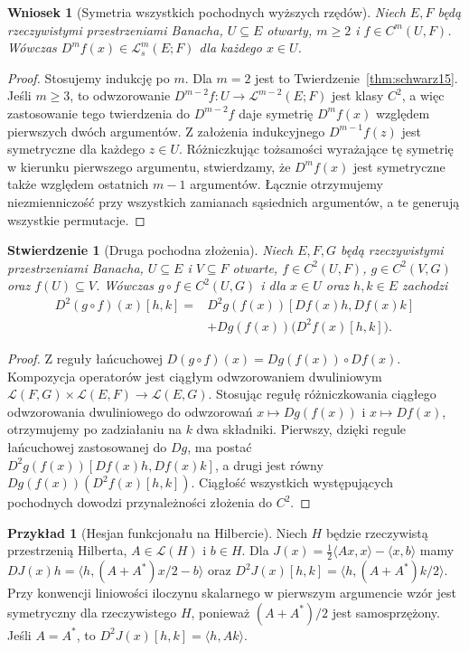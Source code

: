 \documentclass[11pt,a4paper]{article}
\numberwithin{equation}{section}
\theoremstyle{plain}
\newtheorem{stwierdzenie}[twierdzenie]{Stwierdzenie}
\newtheorem{wniosek}[twierdzenie]{Wniosek}
\theoremstyle{definition}
\newtheorem{przyklad}[twierdzenie]{Przykład}
\theoremstyle{remark}
\begin{document}
\begin{wniosek}[Symetria wszystkich pochodnych wyższych rzędów]
\label{cor:symmetric-higher15}
Niech $E,F$ będą rzeczywistymi przestrzeniami Banacha, $U\subseteq E$ otwarty, $m\ge2$ i $f\in C^m(U,F)$. Wówczas $D^mf(x)\in\mathcal L_s^m(E;F)$ dla każdego $x\in U$.
\end{wniosek}
\begin{proof}
Stosujemy indukcję po $m$. Dla $m=2$ jest to Twierdzenie~\ref{thm:schwarz15}. Jeśli $m\ge3$, to odwzorowanie $D^{m-2}f:U\to\mathcal L^{m-2}(E;F)$ jest klasy $C^2$, a więc zastosowanie tego twierdzenia do $D^{m-2}f$ daje symetrię $D^mf(x)$ względem pierwszych dwóch argumentów. Z założenia indukcyjnego $D^{m-1}f(z)$ jest symetryczne dla każdego $z\in U$. Różniczkując tożsamości wyrażające tę symetrię w kierunku pierwszego argumentu, stwierdzamy, że $D^mf(x)$ jest symetryczne także względem ostatnich $m-1$ argumentów. Łącznie otrzymujemy niezmienniczość przy wszystkich zamianach sąsiednich argumentów, a te generują wszystkie permutacje.
\end{proof}

\begin{stwierdzenie}[Druga pochodna złożenia]
\label{prop:second-chain15}
Niech $E,F,G$ będą rzeczywistymi przestrzeniami Banacha, $U\subseteq E$ i $V\subseteq F$ otwarte, $f\in C^2(U,F)$, $g\in C^2(V,G)$ oraz $f(U)\subseteq V$. Wówczas $g\circ f\in C^2(U,G)$ i dla $x\in U$ oraz $h,k\in E$ zachodzi
\[
\begin{aligned}
D^2(g\circ f)(x)[h,k]
={}&D^2g(f(x))[Df(x)h,Df(x)k]\\
 &+Dg(f(x))\bigl(D^2f(x)[h,k]\bigr).
\end{aligned}
\]
\end{stwierdzenie}
\begin{proof}
Z reguły łańcuchowej $D(g\circ f)(x)=Dg(f(x))\circ Df(x)$. Kompozycja operatorów jest ciągłym odwzorowaniem dwuliniowym $\mathcal L(F,G)\times\mathcal L(E,F)\to\mathcal L(E,G)$. Stosując regułę różniczkowania ciągłego odwzorowania dwuliniowego do odwzorowań $x\mapsto Dg(f(x))$ i $x\mapsto Df(x)$, otrzymujemy po zadziałaniu na $k$ dwa składniki. Pierwszy, dzięki regule łańcuchowej zastosowanej do $Dg$, ma postać $D^2g(f(x))[Df(x)h,Df(x)k]$, a drugi jest równy $Dg(f(x))(D^2f(x)[h,k])$. Ciągłość wszystkich występujących pochodnych dowodzi przynależności złożenia do $C^2$.
\end{proof}

\begin{przyklad}[Hesjan funkcjonału na Hilbercie]
\label{ex:hessian15}
Niech $H$ będzie rzeczywistą przestrzenią Hilberta, $A\in\mathcal L(H)$ i $b\in H$. Dla $J(x)=\frac12\langle Ax,x\rangle-\langle x,b\rangle$ mamy
$DJ(x)h=\langle h,(A+A^*)x/2-b\rangle$ oraz
$D^2J(x)[h,k]=\langle h,(A+A^*)k/2\rangle$.
Przy konwencji liniowości iloczynu skalarnego w pierwszym argumencie wzór jest symetryczny dla rzeczywistego $H$, ponieważ $(A+A^*)/2$ jest samosprzężony. Jeśli $A=A^*$, to $D^2J(x)[h,k]=\langle h,Ak\rangle$.
\end{przyklad}
\end{document}
